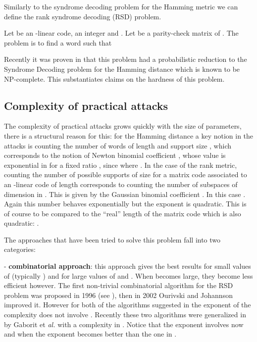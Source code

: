 \documentclass[11pt, a4paper]{llncs}
\begin{document}
Similarly to the syndrome decoding problem for the Hamming metric we can define the rank syndrome
decoding  (RSD) problem.

\begin{problem} \label{prob:RSD}
Let  be an   -linear code,  an
integer and . Let  be a parity-check matrix of . The problem is to find a word  such that

\end{problem}

 Recently it was proven in \cite{GZ14} that this problem had a probabilistic
reduction to the Syndrome Decoding problem for the Hamming distance
which is known to be NP-complete.
This substantiates claims on the hardness of this problem.

\subsection{Complexity of practical attacks}

The complexity of practical attacks grows quickly with the size of parameters,
there is a structural reason for this: for the Hamming distance a key notion
in the attacks is counting the number of words of length  and support size ,
which corresponds to the notion of Newton binomial coefficient , 
whose value is exponential in  for a fixed ratio , since 
 where .
 In the case of the rank metric, counting the number of possible supports of size
 for a matrix code associated to an -linear code of length    corresponds to counting the number
of subspaces of dimension  in . This is given by   the Gaussian binomial coefficient
. In this case . Again this number behaves exponentially but the exponent is quadratic.
This is of course to be compared to the ``real'' length of the matrix code which is also quadratic: .


The approaches that have been tried to solve this problem fall into two categories:

- {\bf combinatorial approach}: this approach gives the best results  for small values
of  (typically ) and for large values of  and .
When  becomes large, they become less efficient however.
The first non-trivial combinatorial algorithm for the RSD problem was proposed in 1996 (see  \cite{CS96}),
then in 2002 Ourivski and Johannson \cite{OJ02} improved it. However for both of the algorithms
suggested in \cite{OJ02} the exponent of the complexity does not involve . Recently these two algorithms were generalized in \cite{GRS13} by Gaborit et {\it al.}
with a complexity in .
Notice that the exponent involves now  and when 
the exponent becomes better than the one in \cite{OJ02}. 
\end{document}

